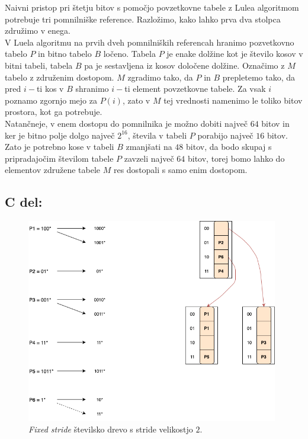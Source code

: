 \documentclass[a4paper,11pt]{article}
\begin{document}
Naivni pristop pri štetju bitov s pomočjo povzetkovne tabele z Lulea algoritmom potrebuje tri pomnilniške reference.
Razložimo, kako lahko prva dva stolpca združimo v enega.
\\
V Luela algoritmu na prvih dveh pomnilniških referencah hranimo pozvetkovno tabelo $P$ in bitno tabelo $B$ ločeno. 
Tabela $P$ je enake dolžine kot je število kosov v bitni tabeli, tabela $B$ pa je sestavljena iz kosov določene dolžine.
Označimo z $M$ tabelo z združenim dostopom. $M$ zgradimo tako, da $P$ in $B$ prepletemo tako, da pred $i-$ti kos v $B$ shranimo $i-$ti element povzetkovne tabele.
Za vsak $i$ poznamo zgornjo mejo za $P(i)$, zato v $M$ tej vrednosti namenimo le toliko bitov prostora, kot ga potrebuje.
\\
Natančneje, 
v enem dostopu do pomnilnika je možno dobiti največ $64$ bitov in ker je bitno polje dolgo največ $2^{16}$, števila v tabeli $P$ porabijo največ $16$ bitov. 
Zato je potrebno kose v tabeli $B$ zmanjšati na $48$ bitov, da bodo skupaj s pripradajočim številom tabele $P$ zavzeli največ $64$ bitov, torej bomo lahko do elementov združene tabele $M$ res dostopali s samo enim dostopom.


\subsection*{C del:}

\begin{figure}[ht!]
    \centering
    \includegraphics[width=110mm]{fixed_stride.png}
    \caption{\textit{Fixed stride} številsko drevo s stride velikostjo $2$.}
\end{figure}
\end{document}
